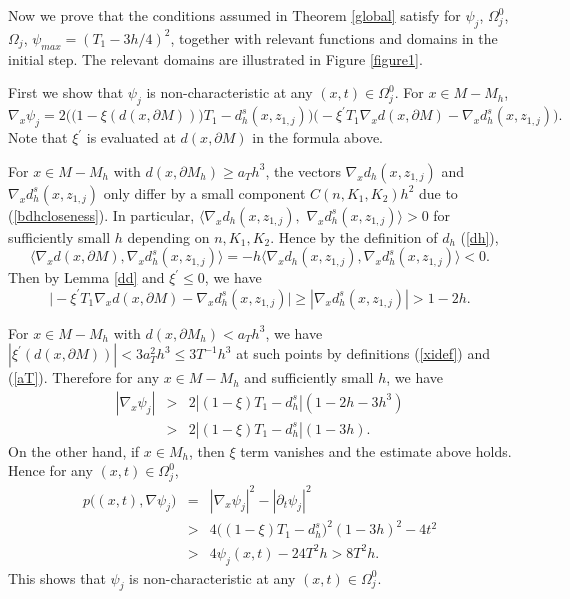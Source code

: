 \documentclass[11pt,letterpaper]{amsart}
\numberwithin{equation}{section}
\theoremstyle{definition}
\theoremstyle{plain}
\theoremstyle{definition}
\theoremstyle{plain}
\theoremstyle{definition}
\theoremstyle{plain}
\begin{document}
Now we prove that the conditions assumed in Theorem \ref{global} satisfy for $\psi_{j}$, $\Omega_{j}^0$, $\Omega_{j}$, $\psi_{max}=(T_1-3h/4)^2$, together with relevant functions and domains in the initial step. The relevant domains are illustrated in Figure \ref{figure1}.

\medskip
First we show that $\psi_j$ is non-characteristic at any $(x,t)\in \Omega^0_j$. For $x\in M-M_h$,
$$\nabla_x\psi_j=2\Big( \big(1-\xi(d(x,\partial M))\big)T_1-d_h^s(x,z_{1,j})\Big)\big(-\xi^{\prime}T_1\nabla_x d(x,\partial M) - \nabla_x d_h^s(x,z_{1,j})\big).$$
Note that $\xi^{\prime}$ is evaluated at $d(x,\partial M)$ in the formula above.

For $x\in M-M_h$ with $d(x,\partial M_h)\geqslant a_T h^3$, the vectors $\nabla_x d_h(x,z_{1,j})$ and $\nabla_x d_h^s(x,z_{1,j})$ only differ by a small component $C(n,K_1,K_2) h^2$ due to (\ref{bdhcloseness}). In particular, $\langle \nabla_x d_h(x,z_{1,j}),$ $\nabla_x d_h^s(x,z_{1,j})\rangle >0$ for sufficiently small $h$ depending on $n,K_1,K_2$. Hence by the definition of $d_h$ (\ref{dh}),
\begin{equation*}\label{opposite}
\langle \nabla_x d(x,\partial M),\nabla_x d_h^s(x,z_{1,j})\rangle=-h\langle \nabla_x d_h(x,z_{1,j}),\nabla_x d_h^s(x,z_{1,j})\rangle<0.
\end{equation*}
Then by Lemma \ref{dd} and $\xi^{\prime}\leqslant 0$, we have
$$\big|-\xi^{\prime}T_1\nabla_x d(x,\partial M) - \nabla_x d_h^s(x,z_{1,j})\big|\geqslant |\nabla_x d_h^s(x,z_{1,j})|>1-2h.$$

For $x\in M-M_h$ with $d(x,\partial M_h)< a_T h^3$, we have $|\xi^{\prime}(d(x,\partial M))|< 3a_T^2 h^{3}\leqslant 3T^{-1} h^3$ at such points by definitions (\ref{xidef}) and (\ref{aT}). Therefore for any $x\in M-M_h$ and sufficiently small $h$, we have
\begin{eqnarray}\label{dpsi}
|\nabla_x\psi_j|&>& 2|(1-\xi)T_1-d_h^s|(1-2h-3h^3) \nonumber \\
&>& 2|(1-\xi)T_1-d_h^s|(1-3h).
\end{eqnarray}
On the other hand, if $x\in M_h$, then $\xi$ term vanishes and the estimate above holds. Hence for any $(x,t)\in\Omega^0_j$,
\begin{eqnarray}\label{ppsi}
p \big((x,t),\nabla \psi_j \big) &=&|\nabla_x \psi_j|^2-|\partial_t \psi_j|^2 \nonumber\\
&>& 4\big((1-\xi)T_1-d_h^s \big)^2(1-3h)^2-4t^2 \nonumber \\
&>& 4\psi_j(x,t) - 24T^2 h > 8T^2 h.
\end{eqnarray}
This shows that $\psi_j$ is non-characteristic at any $(x,t)\in\Omega^0_j$. 
\end{document}
